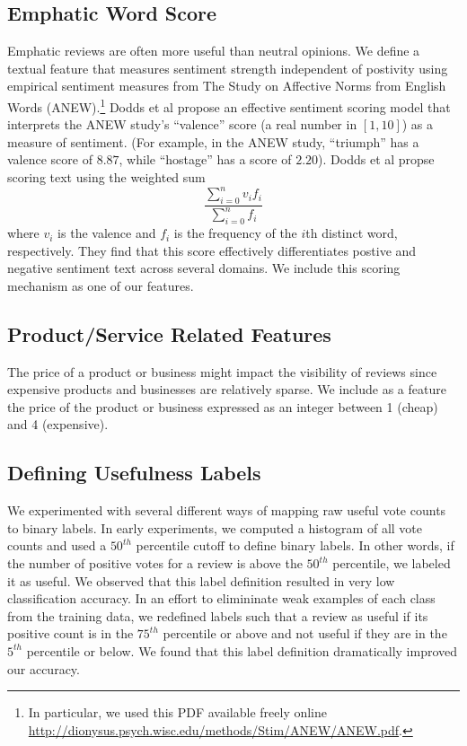 \documentclass[letterpaper]{article}
\begin{document}
\subsection{Emphatic Word Score}
Emphatic reviews are often more useful than neutral opinions.  We define a 
textual feature that measures sentiment strength independent of postivity
using empirical sentiment measures from The Study on Affective Norms from 
English Words (ANEW)\cite{BradleyANEW}.\footnote{In particular, we used this PDF 
available freely online \url{http://dionysus.psych.wisc.edu/methods/Stim/ANEW/ANEW.pdf}.}
Dodds et al \cite{DoddsANEWPaper} propose an effective sentiment scoring model 
that interprets the ANEW study's ``valence'' score (a real number in $[1,10]$) 
as a measure of sentiment.  (For example, in the ANEW study, ``triumph'' has a 
valence score of $8.87$, while ``hostage'' has a score of $2.20$).  Dodds et al 
propse scoring text using the weighted sum 
\[
    \frac{\sum^n_{i=0} v_i f_i}{\sum^n_{i=0} f_i}
\]
where $v_i$ is the valence and $f_i$ is the frequency of the $i$th distinct
word, respectively.  They find that this score effectively differentiates
postive and negative sentiment text across several domains.  We include
this scoring mechanism as one of our features.

\subsection{Product/Service Related Features}
The price of a product or business might impact the visibility of reviews
since expensive products and businesses are relatively sparse.  We include
as a feature the price of the product or business expressed as an integer 
between 1 (cheap) and 4 (expensive).

\subsection{Defining Usefulness Labels}
We experimented with several different ways of mapping raw useful vote
counts to binary labels.  In early experiments, we computed a histogram
of all vote counts and used a $50^{th}$ percentile cutoff to define binary
labels. In other words, if the number of positive votes
for a review is above the $50^{th}$ percentile, we labeled it as
useful. We observed that this label definition resulted in very low
classification accuracy.  In an effort to elimininate weak examples of 
each class from the training data, we redefined labels such that a review as
useful if its positive count is in the $75^{th}$ percentile or above
and not useful if they are in the $5^{th}$ percentile or below.  We found that
this label definition dramatically improved our accuracy.
\end{document}
